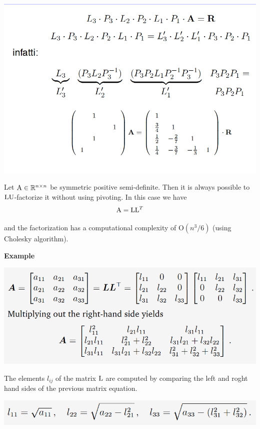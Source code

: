 \includegraphics[width=0.8 \textwidth]{sections/images/lup5.png}


\begin{proposition}
    Let $\mathrm{A} \in \mathbb{R}^{n \times n}$ be symmetric positive semi-definite. Then it is always possible to $\mathrm{LU}$-factorize it without using pivoting. In this case we have
    $$ \mathrm{A} = \mathrm{L}\mathrm{L}^T $$
    
    and the factorization has a computational complexity of $\mathrm{O}(n^3/6)$ (using Cholesky algorithm).
\end{proposition}

\textbf{Example}

\includegraphics[width=0.7 \textwidth]{sections/images/chol1.png}

The elements $l_{ij}$ of the matrix $\mathrm{L}$ are computed by comparing the left and roght hand sides of the previous matrix equation.

\includegraphics[width=0.8 \textwidth]{sections/images/chol2.png}

